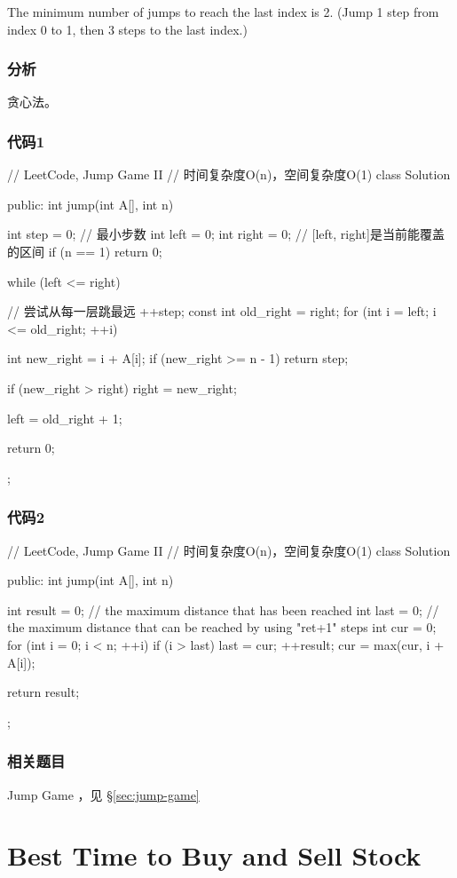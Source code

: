 The minimum number of jumps to reach the last index is 2. (Jump 1 step from index 0 to 1, then 3 steps to the last index.)


\subsubsection{分析}
贪心法。


\subsubsection{代码1}
\begin{Code}
	// LeetCode, Jump Game II
	// 时间复杂度O(n)，空间复杂度O(1)
	class Solution {
		public:
		int jump(int A[], int n) {
			int step = 0; // 最小步数
			int left = 0;
			int right = 0;  // [left, right]是当前能覆盖的区间
			if (n == 1) return 0;
			
			while (left <= right) { // 尝试从每一层跳最远
				++step;
				const int old_right = right;
				for (int i = left; i <= old_right; ++i) {
					int new_right = i + A[i];
					if (new_right >= n - 1) return step;
					
					if (new_right > right) right = new_right;
				}
				left = old_right + 1;
			}
			return 0;
		}
	};
\end{Code}


\subsubsection{代码2}
\begin{Code}
	// LeetCode, Jump Game II
	// 时间复杂度O(n)，空间复杂度O(1)
	class Solution {
		public:
		int jump(int A[], int n) {
			int result = 0;
			// the maximum distance that has been reached
			int last = 0;
			// the maximum distance that can be reached by using "ret+1" steps
			int cur = 0;
			for (int i = 0; i < n; ++i) {
				if (i > last) {
					last = cur;
					++result;
				}
				cur = max(cur, i + A[i]);
			}
			
			return result;
		}
	};
\end{Code}


\subsubsection{相关题目}
\begindot
\item Jump Game ，见 \S \ref{sec:jump-game}
\myenddot


\section{Best Time to Buy and Sell Stock} %
\label{sec:best-time-to-buy-and-sell-stock}


